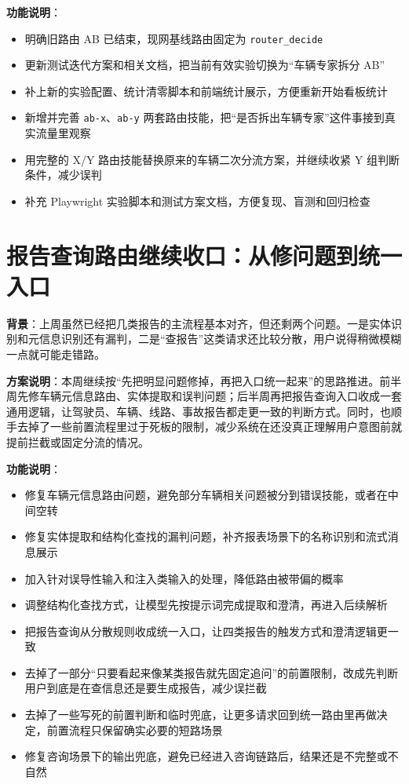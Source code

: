 \documentclass[UTF8]{ctexart}
\begin{document}
\textbf{功能说明}：
\begin{itemize}
\item 明确旧路由 AB 已结束，现网基线路由固定为 \texttt{router\_decide}
\item 更新测试迭代方案和相关文档，把当前有效实验切换为“车辆专家拆分 AB”
\item 补上新的实验配置、统计清零脚本和前端统计展示，方便重新开始看板统计
\item 新增并完善 \texttt{ab-x}、\texttt{ab-y} 两套路由技能，把“是否拆出车辆专家”这件事接到真实流量里观察
\item 用完整的 X/Y 路由技能替换原来的车辆二次分流方案，并继续收紧 Y 组判断条件，减少误判
\item 补充 Playwright 实验脚本和测试方案文档，方便复现、盲测和回归检查
\end{itemize}

\section{报告查询路由继续收口：从修问题到统一入口}

\textbf{背景}：上周虽然已经把几类报告的主流程基本对齐，但还剩两个问题。一是实体识别和元信息识别还有漏判，二是“查报告”这类请求还比较分散，用户说得稍微模糊一点就可能走错路。

\textbf{方案说明}：本周继续按“先把明显问题修掉，再把入口统一起来”的思路推进。前半周先修车辆元信息路由、实体提取和误判问题；后半周再把报告查询入口收成一套通用逻辑，让驾驶员、车辆、线路、事故报告都走更一致的判断方式。同时，也顺手去掉了一些前置流程里过于死板的限制，减少系统在还没真正理解用户意图前就提前拦截或固定分流的情况。

\textbf{功能说明}：
\begin{itemize}
\item 修复车辆元信息路由问题，避免部分车辆相关问题被分到错误技能，或者在中间空转
\item 修复实体提取和结构化查找的漏判问题，补齐报表场景下的名称识别和流式消息展示
\item 加入针对误导性输入和注入类输入的处理，降低路由被带偏的概率
\item 调整结构化查找方式，让模型先按提示词完成提取和澄清，再进入后续解析
\item 把报告查询从分散规则收成统一入口，让四类报告的触发方式和澄清逻辑更一致
\item 去掉了一部分“只要看起来像某类报告就先固定追问”的前置限制，改成先判断用户到底是在查信息还是要生成报告，减少误拦截
\item 去掉了一些写死的前置判断和临时兜底，让更多请求回到统一路由里再做决定，前置流程只保留确实必要的短路场景
\item 修复咨询场景下的输出兜底，避免已经进入咨询链路后，结果还是不完整或不自然
\end{itemize}
\end{document}
